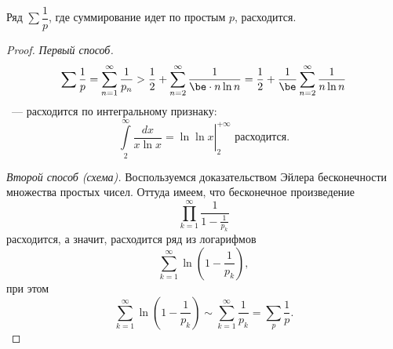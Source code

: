 \begin{imp}
  Ряд $\displaystyle \sum\dfrac{1}{p}$, где суммирование идет по простым $p$, расходится.
\end{imp}
\begin{proof}
  \textit{Первый способ.}
  $$
    \sum\frac1p=\sum_{n=1}^\infty\frac1{p_n}>\frac12+\sum_{n=2}^\infty\frac1{\be\cdot n\ln{n}}=\frac12+\frac1{\be}\sum_{n=2}^\infty\frac1{n\ln{n}}
  $$~—
  расходится по интегральному признаку:
  $$
    \int\limits_2^\infty\left.\frac{dx}{x\ln{x}}=\ln{\ln{x}}\right|_2^{+\infty}\text{ расходится}.
  $$

  \textit{Второй способ (схема).} Воспользуемся доказательством Эйлера бесконечности множества простых чисел. Оттуда имеем, что бесконечное произведение
  $$
    \prod_{k=1}^\infty\frac{1}{1-\tfrac{1}{p_k}}
  $$
  расходится, а значит, расходится ряд из логарифмов
  $$
    \sum_{k=1}^\infty\ln{\left(1-\frac1{p_k}\right)},
  $$
  при этом
  $$
    \sum_{k=1}^\infty\ln{\left(1-\frac1{p_k}\right)}\sim\sum_{k=1}^\infty\frac1{p_k}=\sum_p\frac1p.
  $$
\end{proof} 
